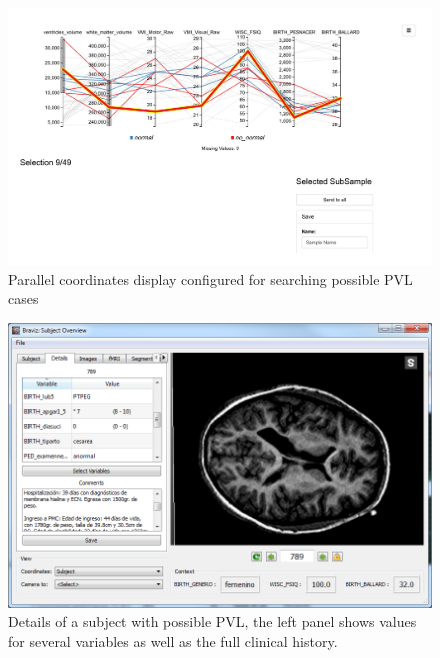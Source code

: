 \documentclass{frontiersHLTH}
\begin{document}
\begin{figure}
\begin{center}
\includegraphics[width=\linewidth,trim = 30mm 90mm 60mm 10mm ,clip]{parallel_coordinates_raw}
\end{center}
 \caption{\label{fig_parallel}Parallel coordinates display configured for searching possible PVL cases}
\end{figure}


\begin{figure}
\begin{center}
\includegraphics[width=\linewidth]{pvl_details}
\end{center}
 \caption{\label{fig_subject3}Details of a subject with possible PVL, the left panel shows values for several variables as well as the full clinical history.}
\end{figure}
\end{document}
